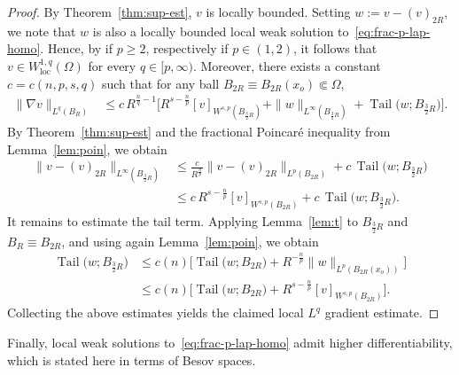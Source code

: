 \documentclass[10pt,letterpaper]{amsart}
\theoremstyle{definition}
\numberwithin{theorem}{section}
\numberwithin{equation}{section}
\newcommand{\1}{\ensuremath{\mathds{1}}}
\DeclareMathOperator{\loc}{loc}
\DeclareMathOperator{\Tail}{Tail}
\numberwithin{equation}{section}
\begin{document}
\begin{proof}
By Theorem~\ref{thm:sup-est}, $v$ is locally bounded. Setting
$w:=v-(v)_{2R}$, we note that $w$ is also a locally bounded local weak
solution to~\eqref{eq:frac-p-lap-homo}. Hence, by
\cite[Theorem~1.4]{BDLMS-1} if $p\ge2$, respectively
\cite[Theorem~1.2]{BDLMS-2} if $p\in(1,2)$, it follows that
$v\in W^{1,q}_{\loc}(\Omega)$ for every $q\in[p,\infty)$. Moreover, there
exists a constant $c=c(n,p,s,q)$ such that for any ball
$B_{2R}\equiv B_{2R}(x_o)\Subset\Omega$,
\begin{align*}
    \|\nabla v\|_{L^q(B_R)}
    &\le
    c\,R^{\frac{n}{q}-1}
    \Big[
        R^{s-\frac{n}{p}} [v]_{W^{s,p}(B_{\frac32 R})}
        + \|w\|_{L^\infty(B_{\frac32 R})}
        + \Tail\big(w;B_{\frac32 R}\big)
    \Big].
\end{align*}
By Theorem~\ref{thm:sup-est} and the fractional Poincar\'e inequality from
Lemma~\ref{lem:poin}, we obtain
\begin{align*}
    \|v-(v)_{2R}\|_{L^\infty(B_{\frac32 R})}
    &\le
     \frac{c}{R^{\frac{n}{p}}} \|v-(v)_{2R}\|_{L^p(B_{2R})}
     + c\,\Tail\big(w;B_{\frac32 R}\big)\\
     &\le
     c\, R^{s-\frac{n}{p}} [v]_{W^{s,p}(B_{2R})}
     + c\,\Tail\big(w;B_{\frac32 R}\big).
\end{align*}
It remains to estimate the tail term. Applying Lemma~\ref{lem:t} to
$B_{\frac32 R}$ and $B_R\equiv B_{2R}$, and using again
Lemma~\ref{lem:poin}, we obtain
\begin{align*}
    \Tail\big(w;B_{\frac32 R}\big)
    &\le 
    c(n)\Big[
        \Tail \big(w; B_{2R}\big)
        + 
        R^{-\frac{n}{p}}\| w\|_{L^p(B_{2R}(x_o))}
    \Big] \\
    &\le 
    c(n)\Big[
        \Tail \big(w; B_{2R}\big)
        + 
        R^{s-\frac{n}{p}} [v]_{W^{s,p}(B_{2R})}
    \Big].
\end{align*}
Collecting the above estimates yields the claimed local $L^q$ gradient estimate.
\end{proof}

Finally, local weak solutions to~\eqref{eq:frac-p-lap-homo} admit higher differentiability, which is stated here in terms of Besov spaces. 
\end{document}
